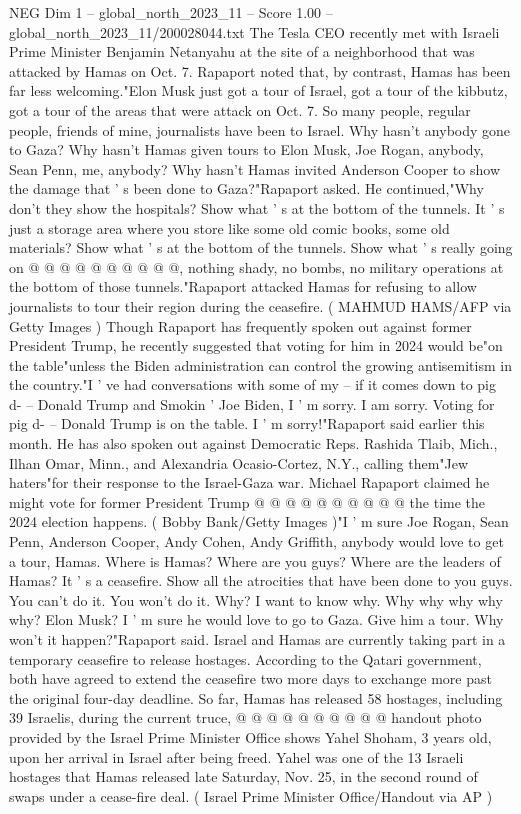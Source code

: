 \begin{textsample}{NEG Dim 1 – global\_north\_2023\_11 – Score 1.00 – global\_north\_2023\_11/200028044.txt}  \label{ex:f1_neg_100}
The Tesla CEO recently met with Israeli Prime Minister Benjamin Netanyahu at the site of a neighborhood that was attacked by Hamas on Oct. 7.
Rapaport noted that, by contrast, Hamas has been far less welcoming."Elon Musk just got a tour of Israel, got a tour of the kibbutz, got a tour of the areas that were attack on Oct. 7.
So many people, regular people, friends of mine, journalists have been to Israel.
Why hasn't anybody gone to Gaza?
Why hasn't Hamas given tours to Elon Musk, Joe Rogan, anybody, Sean Penn, me, anybody?
Why hasn't Hamas invited Anderson Cooper to show the damage that ' s been done to Gaza?"Rapaport asked.
He continued,"Why don't they show the hospitals?
Show what ' s at the bottom of the tunnels.
It ' s just a storage area where you store like some old comic books, some old materials?
Show what ' s at the bottom of the tunnels.
Show what ' s really going on @ @ @ @ @ @ @ @ @ @, nothing shady, no bombs, no military operations at the bottom of those tunnels."Rapaport attacked Hamas for refusing to allow journalists to tour their region during the ceasefire. ( MAHMUD HAMS/AFP via Getty Images ) Though Rapaport has frequently spoken out against former President Trump, he recently suggested that voting for him in 2024 would be"on the table"unless the Biden administration can control the growing antisemitism in the country."I ' ve had conversations with some of my -- if it comes down to pig d- -- Donald Trump and Smokin ' Joe Biden, I ' m sorry.
I am sorry.
Voting for pig d- -- Donald Trump is on the table.
I ' m sorry!"Rapaport said earlier this month.
He has also spoken out against Democratic Reps.
Rashida Tlaib, Mich., Ilhan Omar, Minn., and Alexandria Ocasio-Cortez, N.Y., calling them"Jew haters"for their response to the Israel-Gaza war.
Michael Rapaport claimed he might vote for former President Trump @ @ @ @ @ @ @ @ @ @ the time the 2024 election happens. ( Bobby Bank/Getty Images )"I ' m sure Joe Rogan, Sean Penn, Anderson Cooper, Andy Cohen, Andy Griffith, anybody would love to get a tour, Hamas.
Where is Hamas?
Where are you guys?
Where are the leaders of Hamas?
It ' s a ceasefire.
Show all the atrocities that have been done to you guys.
You can't do it.
You won't do it.
Why?
I want to know why.
Why why why why why?
Elon Musk?
I ' m sure he would love to go to Gaza.
Give him a tour.
Why won't it happen?"Rapaport said.
Israel and Hamas are currently taking part in a temporary ceasefire to release hostages.
According to the Qatari government, both have agreed to extend the ceasefire two more days to exchange more past the original four-day deadline.
So far, Hamas has released 58 hostages, including 39 Israelis, during the current truce, @ @ @ @ @ @ @ @ @ @ handout photo provided by the Israel Prime Minister Office shows Yahel Shoham, 3 years old, upon her arrival in Israel after being freed.
Yahel was one of the 13 Israeli hostages that Hamas released late Saturday, Nov. 25, in the second round of swaps under a cease-fire deal. ( Israel Prime Minister Office/Handout via AP )

\end{textsample}

